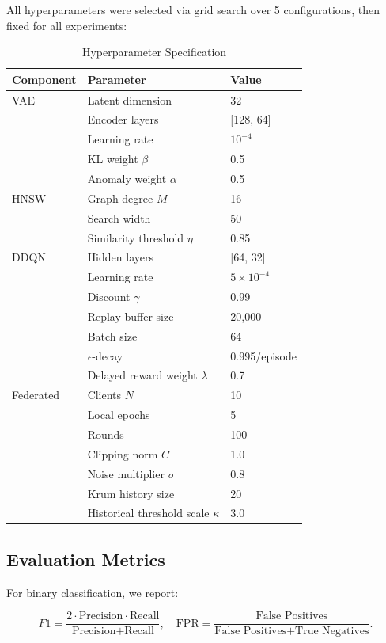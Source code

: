 \documentclass[preprint,12pt]{elsarticle}
\begin{document}
All hyperparameters were selected via grid search over 5 configurations, then fixed for all experiments:

\begin{table}[!t]
\caption{Hyperparameter Specification}
\label{tab:hparams}
\centering
\small
\renewcommand{\arraystretch}{1.1}
\begin{tabular}{@{}lll@{}}
\toprule
\textbf{Component} & \textbf{Parameter} & \textbf{Value} \\
\midrule
VAE & Latent dimension & 32 \\
& Encoder layers & [128, 64] \\
& Learning rate & $10^{-4}$ \\
& KL weight $\beta$ & 0.5 \\
& Anomaly weight $\alpha$ & 0.5 \\
\midrule
HNSW & Graph degree $M$ & 16 \\
& Search width & 50 \\
& Similarity threshold $\eta$ & 0.85 \\
\midrule
DDQN & Hidden layers & [64, 32] \\
& Learning rate & $5 \times 10^{-4}$ \\
& Discount $\gamma$ & 0.99 \\
& Replay buffer size & 20,000 \\
& Batch size & 64 \\
& $\epsilon$-decay & 0.995/episode \\
& Delayed reward weight $\lambda$ & 0.7 \\
\midrule
Federated & Clients $N$ & 10 \\
& Local epochs & 5 \\
& Rounds & 100 \\
& Clipping norm $C$ & 1.0 \\
& Noise multiplier $\sigma$ & 0.8 \\
& Krum history size & 20 \\
& Historical threshold scale $\kappa$ & 3.0 \\
\bottomrule
\end{tabular}
\end{table}

\subsection{Evaluation Metrics}

For binary classification, we report:

\begin{equation}
F1 = \frac{2 \cdot \text{Precision} \cdot \text{Recall}}{\text{Precision} + \text{Recall}}, \quad
\text{FPR} = \frac{\text{False Positives}}{\text{False Positives} + \text{True Negatives}}.
\end{equation}
\end{document}

